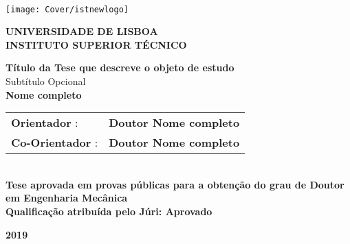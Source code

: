 \setcounter{page}{1} 


\thispagestyle{empty}
\begin{flushleft} ~\\ \vspace{-12mm} \hspace{-12mm}  \texttt{[image: Cover/istnewlogo]} 
 
\centering
\LARGE \textbf{UNIVERSIDADE DE LISBOA \\ INSTITUTO SUPERIOR TÉCNICO}
\vspace{30mm}

 \vspace{5mm}
 
\centering
\LARGE \textbf{Título da Tese que descreve o objeto de estudo}
\\ \vspace{10mm}
\Large Subtítulo Opcional
\\ \vspace{15mm}
\LARGE \textbf{Nome completo} \\
\vspace{4cm}

\begin{minipage}{\textwidth}
\begin{tabularx}{\textwidth}{ l @{ } l }
\Large \textbf{Orientador} : & \textbf{Doutor Nome completo}\\
 \Large \textbf{Co-Orientador} :  & \textbf{Doutor Nome completo}\\
\end{tabularx}

\end{minipage}
%
\\ \vspace{20mm}
\centering
\Large \textbf{Tese aprovada em provas públicas para a obtenção do grau de Doutor em Engenharia Mecânica}\\
\vspace{8mm}
\Large \textbf{Qualificação atribuída pelo Júri: Aprovado}
 
\vspace{20mm}

\large \textbf{2019} \\
\let\thepage\relax
\end{flushleft}
\pagebreak
